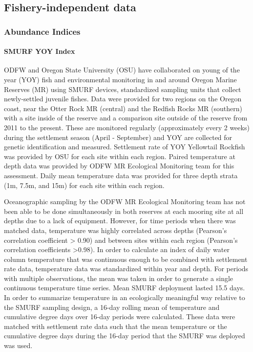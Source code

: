 \documentclass[
]{scrartcl}
\let\oldparagraph\paragraph
\renewcommand{\paragraph}[1]{\oldparagraph{#1}\mbox{}}
\begin{document}
\hypertarget{fishery-independent-data}{%
\subsection{Fishery-independent data}\label{fishery-independent-data}}

\hypertarget{abundance-indices-1}{%
\subsubsection{Abundance Indices}\label{abundance-indices-1}}

\hypertarget{smurf-yoy-index}{%
\paragraph{SMURF YOY Index}\label{smurf-yoy-index}}

ODFW and Oregon State University (OSU) have collaborated on young of the
year (YOY) fish and environmental monitoring in and around Oregon Marine
Reserves (MR) using SMURF devices, standardized sampling units that
collect newly-settled juvenile fishes. Data were provided for two
regions on the Oregon coast, near the Otter Rock MR (central) and the
Redfish Rocks MR (southern) with a site inside of the reserve and a
comparison site outside of the reserve from 2011 to the present. These
are monitored regularly (approximately every 2 weeks) during the
settlement season (April - September) and YOY are collected for genetic
identification and measured. Settlement rate of YOY Yellowtail Rockfish
was provided by OSU for each site within each region. Paired temperature
at depth data was provided by ODFW MR Ecological Monitoring team for
this assessment. Daily mean temperature data was provided for three
depth strata (1m, 7.5m, and 15m) for each site within each region.

Oceanographic sampling by the ODFW MR Ecological Monitoring team has not
been able to be done simultaneously in both reserves at each mooring
site at all depths due to a lack of equipment. However, for time periods
when there was matched data, temperature was highly correlated across
depths (Pearson's correlation coefficient \textgreater{} 0.90) and
between sites within each region (Pearson's correlation coefficients
\textgreater0.98). In order to calculate an index of daily water column
temperature that was continuous enough to be combined with settlement
rate data, temperature data was standardized within year and depth. For
periods with multiple observations, the mean was taken in order to
generate a single continuous temperature time series. Mean SMURF
deployment lasted 15.5 days. In order to summarize temperature in an
ecologically meaningful way relative to the SMURF sampling design, a
16-day rolling mean of temperature and cumulative degree days over
16-day periods were calculated. These data were matched with settlement
rate data such that the mean temperature or the cumulative degree days
during the 16-day period that the SMURF was deployed was used.
\end{document}
